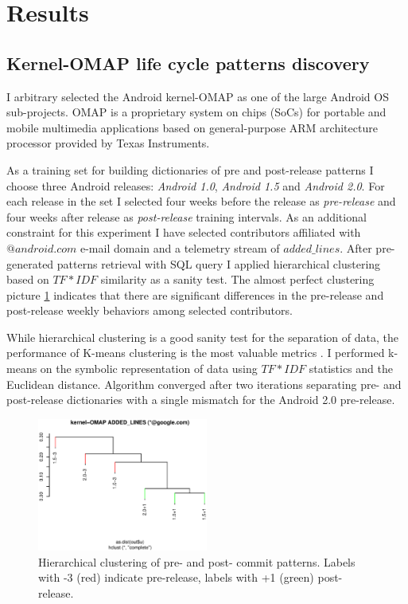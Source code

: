 \documentclass[10pt, conference, compsocconf]{IEEEtran}
\begin{document}
\section{Results}
\subsection{Kernel-OMAP life cycle patterns discovery}
I arbitrary selected the Android kernel-OMAP as one of the large Android OS sub-projects. 
OMAP is a proprietary system on chips (SoCs) for portable and mobile multimedia applications 
based on general-purpose ARM architecture processor provided by Texas Instruments.

As a training set for building dictionaries of pre and post-release patterns I choose three Android releases:
\textit{Android 1.0}, \textit{Android 1.5} and \textit{Android 2.0}. For each release in the set I selected four 
weeks before the release as \textit{pre-release} and four weeks after release as \textit{post-release} 
training intervals. As an additional constraint for this experiment I have selected contributors affiliated
with $@android.com$ e-mail domain and a telemetry stream of $added\_lines$.
After pre-generated patterns retrieval with SQL query I applied hierarchical clustering 
based on $TF\ast IDF$ similarity as a sanity test. The almost perfect clustering picture \ref{fig:kernel_cluster}
indicates that there are significant differences in the pre-release and post-release weekly behaviors among 
selected contributors.

While hierarchical clustering is a good sanity test for the separation of data, the performance of K-means 
clustering is the most valuable metrics \cite{citeulike:3562}. I performed k-means on the symbolic 
representation of data using $TF\ast IDF$ statistics and the Euclidean distance. Algorithm converged after two
iterations separating pre- and post-release dictionaries with a single mismatch for the Android 2.0 pre-release.

\begin{figure}[htb]
  \centering
  \includegraphics[width=0.5\textwidth]{figures/omap-google-added.ps}
  \caption{Hierarchical clustering of pre- and post- commit patterns. Labels with -3 (red) indicate pre-release, labels with +1 (green) post-release.}
  \label{fig:kernel_cluster}
\end{figure}
\end{document}
